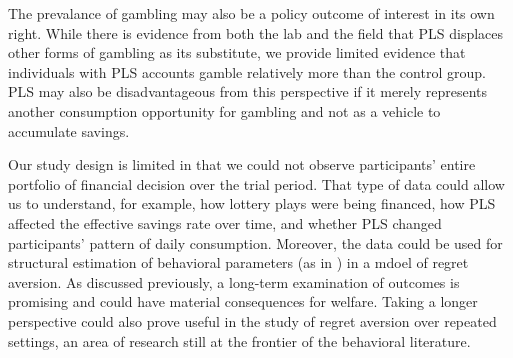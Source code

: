 \documentclass[11pt]{article}
\begin{document}
	The prevalance of gambling may also be a policy outcome of interest in its own right. While there is evidence from both the lab and the field that PLS displaces other forms of gambling as its substitute, we provide limited evidence that individuals with PLS accounts gamble relatively more than the control group. PLS may also be disadvantageous from this perspective if it merely represents another consumption opportunity for gambling and not as a vehicle to accumulate savings.

	Our study design is limited in that we could not observe participants' entire portfolio of financial decision over the trial period. That type of data could allow us to understand, for example, how lottery plays were being financed, how PLS affected the effective savings rate over time, and whether PLS changed participants' pattern of daily consumption. Moreover, the data could be used for structural estimation of behavioral parameters (as in \textcite{filiz-ozbay_lottery_2015}) in a mdoel of regret aversion. As discussed previously, a long-term examination of outcomes is promising and could have material consequences for welfare. Taking a longer perspective could also prove useful in the study of regret aversion over repeated settings, an area of research still at the frontier of the behavioral literature.

\newpage

\printbibliography
\end{document}
